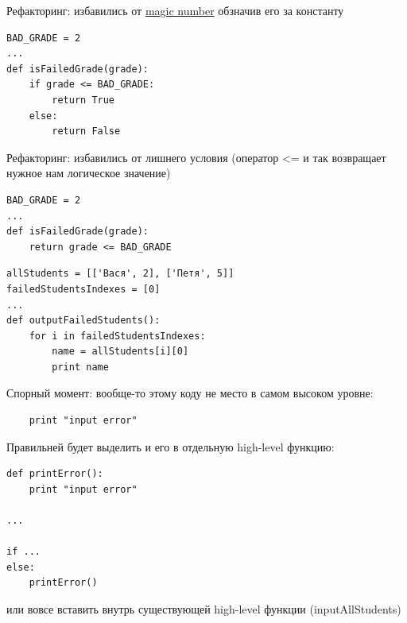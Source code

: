 {\begin{frame}[fragile]
  Рефакторинг: избавились от \underline{magic number} обзначив его за константу
  \vspace{1cm}
  \begin{verbatim}
BAD_GRADE = 2
...
def isFailedGrade(grade):
    if grade <= BAD_GRADE:
        return True
    else:
        return False
  \end{verbatim}
\end{frame}

\begin{frame}[fragile]
  Рефакторинг: избавились от лишнего условия (оператор <= и так возвращает нужное нам логическое значение)
  \vspace{1cm}
  \begin{verbatim}
BAD_GRADE = 2
...
def isFailedGrade(grade):
    return grade <= BAD_GRADE
  \end{verbatim}
\end{frame}

\begin{frame}[fragile]
  \begin{verbatim}
allStudents = [['Вася', 2], ['Петя', 5]]
failedStudentsIndexes = [0]
...
def outputFailedStudents():
    for i in failedStudentsIndexes:
        name = allStudents[i][0]
        print name
  \end{verbatim}
\end{frame}

\begin{frame}[fragile]
  Спорный момент: вообще-то этому коду не место в самом высоком уровне:

  \vspace{1cm}
  \begin{verbatim}
    print "input error"
  \end{verbatim}
\end{frame}

\begin{frame}[fragile]
  Правильней будет выделить и его в отдельную high-level функцию:

  \vspace{0.5cm}
  \begin{verbatim}
def printError():
    print "input error"

...

if ...
else:
    printError()
  \end{verbatim}

  \vspace{0.5cm}
  или вовсе вставить внутрь существующей high-level функции (inputAllStudents)
\end{frame}

}

